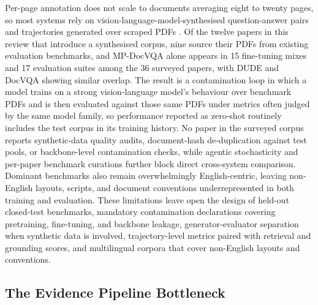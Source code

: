\documentclass[11pt]{article}
\begin{document}
Per-page annotation does not scale to documents averaging eight to twenty pages, so most systems rely on vision-language-model-synthesised question-answer pairs and trajectories generated over scraped PDFs \cite{tanaka2024instructdoc,jain2025simpledoc,xiong2026docr1,zhang2026docdancer}. Of the twelve papers in this review that introduce a synthesised corpus, nine source their PDFs from existing evaluation benchmarks, and MP-DocVQA alone appears in 15 fine-tuning mixes and 17 evaluation suites among the 36 surveyed papers, with DUDE and DocVQA showing similar overlap. The result is a contamination loop in which a model trains on a strong vision-language model's behaviour over benchmark PDFs and is then evaluated against those same PDFs under metrics often judged by the same model family, so performance reported as zero-shot routinely includes the test corpus in its training history. No paper in the surveyed corpus reports synthetic-data quality audits, document-hash de-duplication against test pools, or backbone-level contamination checks, while agentic stochasticity and per-paper benchmark curations further block direct cross-system comparison. Dominant benchmarks also remain overwhelmingly English-centric, leaving non-English layouts, scripts, and document conventions underrepresented in both training and evaluation. These limitations leave open the design of held-out closed-test benchmarks, mandatory contamination declarations covering pretraining, fine-tuning, and backbone leakage, generator-evaluator separation when synthetic data is involved, trajectory-level metrics paired with retrieval and grounding scores, and multilingual corpora that cover non-English layouts and conventions.

\subsection{The Evidence Pipeline Bottleneck}
\end{document}
